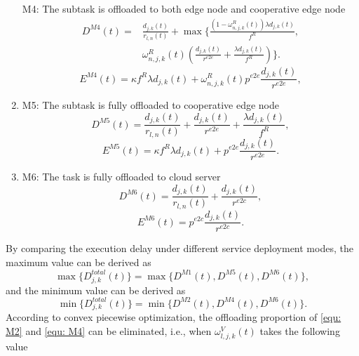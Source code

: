 \documentclass[lettersize,journal]{IEEEtran}
\begin{document}
\begin{enumerate}
	M4: The subtask is offloaded to both  edge node and cooperative edge node 
	\begin{equation}
		\label{equ: M4}
		\begin{aligned}
			D^{M4}(t)=  & \frac{d_{j,k}(t)}{r_{l,n}(t)}+ \max\Bigg\{ \frac{(1-\omega^{R}_{n,j,k}(t)) \lambda d_{j,k}(t)}{f^{R}}, \\
						& \omega^{R}_{n,j,k}(t)\left(   \frac{d_{j,k}(t)}{r^{e2e}} +  \frac{\lambda d_{j,k}(t)}{f^{R}} \right) \Bigg\}.
		\end{aligned}
	\end{equation}
	\begin{equation}
		E^{M4}(t) = \kappa f^{R} \lambda d_{j,k}(t) + \omega_{n,j,k}^{R}(t) p^{e2e} \frac{d_{j,k}(t)}{r^{e2e}},
	\end{equation}
	\item 
	M5: The subtask is fully offloaded to  cooperative edge node 
	\begin{equation}
		\label{equ: M5}
		D^{M5}(t)=  \frac{d_{j,k}(t)}{r_{l,n}(t)} + \frac{d_{j,k}(t)}{r^{e2e}} +\frac{\lambda d_{j,k}(t)}{f^{R}},
	\end{equation}
	\begin{equation}
		E^{M5}(t) = \kappa f^{R} \lambda d_{j,k}(t) +p^{e2e} \frac{d_{j,k}(t)}{r^{e2e}}.
	\end{equation}
	\item
	M6: The task is fully offloaded to cloud server
	\begin{equation}
		\label{equ: M6}
		D^{M6}(t)= \frac{d_{j,k}(t)}{r_{l,n}(t)}+ \frac{d_{j,k}(t)}{r^{e2c}},
	\end{equation}
	\begin{equation}
		E^{M6}(t) = p^{e2c} \frac{d_{j,k}(t)}{r^{e2c}}.
	\end{equation}
\end{enumerate}
By comparing the execution delay under different service deployment modes, the maximum value  can be derived as
\begin{equation}
	\label{equ: max delay}
	\max\{D_{j,k}^{total}(t)\} = \max\{ D^{M1}(t), D^{M5}(t), D^{M6}(t) \},
\end{equation}
and the minimum value can be derived as
\begin{equation}
	\min\{D_{j,k}^{total}(t)\} = \min\{D^{M2}(t), D^{M4}(t), D^{M6}(t)\}.
\end{equation}
According to convex piecewise optimization, the offloading proportion of \eqref{equ: M2} and \eqref{equ: M4} can be eliminated, i.e., when  $ \omega^{V}_{l,j,k}(t) $ takes the following value
\end{document}
